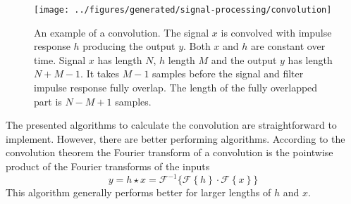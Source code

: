 \begin{figure}[H]
        \centering
        \texttt{[image: ../figures/generated/signal-processing/convolution]}
        \caption{An example of a convolution. The signal $x$ is convolved with impulse response $h$ producing the output $y$.
        Both $x$ and $h$ are constant over time. Signal $x$ has length $N$, $h$ length $M$ and the output $y$ has length $N+M-1$. It takes $M-1$ samples before the signal and filter impulse response fully overlap.
        The length of the fully overlapped part is $N-M+1$ samples.
        }
        \label{fig:theory_signal_processing_convolution}
\end{figure}

The presented algorithms to calculate the convolution are straightforward to implement.
However, there are better performing algorithms. According to the convolution
theorem the Fourier transform of a convolution is the pointwise product of the
Fourier transforms of the inputs
\begin{equation}\label{eq:theory_signal_processing_convolution_fourier}
 y = h \star x = \mathcal{F}^{-1} \Big\{ \mathcal{F}\left\{ h \right\} \cdot \mathcal{F}\left\{ x \right\} \Big\}
\end{equation}
This algorithm generally performs better for larger lengths of $h$ and $x$.

